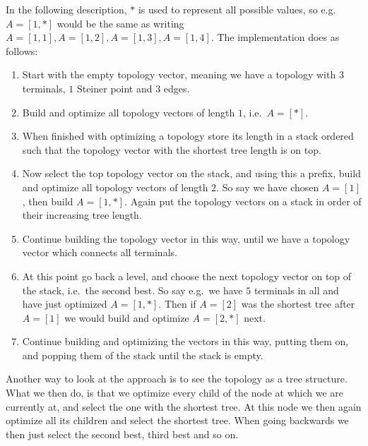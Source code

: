 In the following description, $\ast$ is used to represent all possible values,
so e.g.\ $A = [1, \ast]$ would be the same as writing
$A = [1, 1], A = [1, 2], A = [1,3], A = [1, 4]$. The implementation does as
follows:
%
\begin{enumerate}
\item Start with the empty topology vector, meaning we have a topology with $3$
  terminals, $1$ Steiner point and $3$ edges.
\item Build and optimize all topology vectors of length $1$, i.e.\ $A = [\ast]$.
\item When finished with optimizing a topology store its length in a stack
  ordered such that the topology vector with the shortest tree length is on top.
\item Now select the top topology vector on the stack, and using this a prefix,
  build and optimize all topology vectors of length $2$. So say we have chosen $A = [1]$,
  then build $A = [1, \ast]$. Again put the
  topology vectors on a stack in order of their increasing tree length.
\item Continue building the topology vector in this way, until we have a
  topology vector which connects all terminals.
\item At this point go back a level, and choose the next topology vector on top
  of the stack, i.e.\ the second best. So say e.g.\ we have $5$ terminals in all
  and have just optimized $A = [1, \ast]$. Then if $A = [2]$ was the shortest tree
  after $A = [1]$ we would build and optimize $A = [2, \ast]$ next.
\item Continue building and optimizing the vectors in this way, putting them on,
  and popping them of the stack until the stack is empty.
\end{enumerate}
%
Another way to look at the approach is to see the topology as a tree
structure. What we then do, is that we optimize every child of the node at which
we are currently at, and select the one with the shortest tree. At this node we
then again optimize all its children and select the shortest tree. When going
backwards we then just select the second best, third best and so on.

